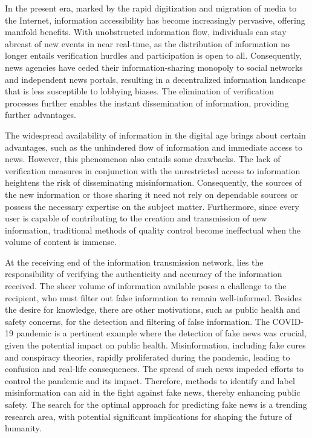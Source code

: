 In the present era, marked by the rapid digitization and migration of media to the Internet, information accessibility has become increasingly pervasive, offering manifold benefits. With unobstructed information flow, individuals can stay abreast of new events in near real-time, as the distribution of information no longer entails verification hurdles and participation is open to all. Consequently, news agencies have ceded their information-sharing monopoly to social networks and independent news portals, resulting in a decentralized information landscape that is less susceptible to lobbying biases. The elimination of verification processes further enables the instant dissemination of information, providing further advantages.

The widespread availability of information in the digital age brings about certain advantages, such as the unhindered flow of information and immediate access to news. However, this phenomenon also entails some drawbacks. The lack of verification measures in conjunction with the unrestricted access to information heightens the risk of disseminating misinformation. Consequently, the sources of the new information or those sharing it need not rely on dependable sources or possess the necessary expertise on the subject matter. Furthermore, since every user is capable of contributing to the creation and transmission of new information, traditional methods of quality control become ineffectual when the volume of content is immense.


At the receiving end of the information transmission network, lies the responsibility of verifying the authenticity and accuracy of the information received. The sheer volume of information available poses a challenge to the recipient, who must filter out false information to remain well-informed. Besides the desire for knowledge, there are other motivations, such as public health and safety concerns, for the detection and filtering of false information. The COVID-19 pandemic is a pertinent example where the detection of fake news was crucial, given the potential impact on public health. Misinformation, including fake cures and conspiracy theories, rapidly proliferated during the pandemic, leading to confusion and real-life consequences. The spread of such news impeded efforts to control the pandemic and its impact. Therefore, methods to identify and label misinformation can aid in the fight against fake news, thereby enhancing public safety. The search for the optimal approach for predicting fake news is a trending research area, with potential significant implications for shaping the future of humanity.

